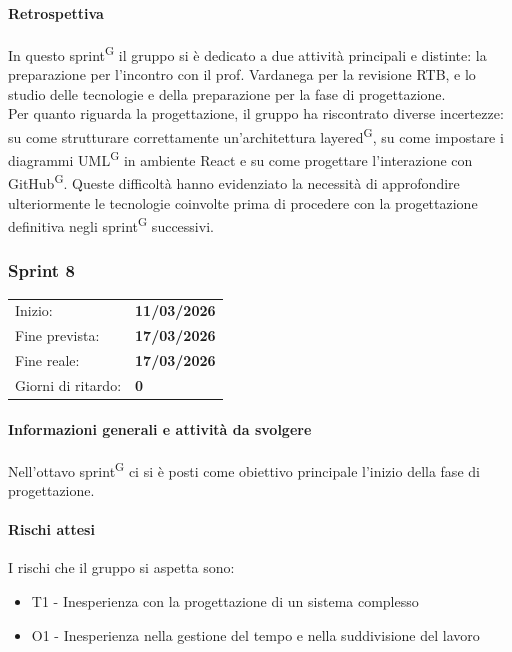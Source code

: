 \documentclass[a4paper, 11pt]{article}
\newcommand{\subsubsubsection}[1]{\paragraph{#1}}
\begin{document}
\subsubsubsection{Retrospettiva}
In questo sprint\textsuperscript{G} il gruppo si è dedicato a due attività principali e distinte: la preparazione per l'incontro con il prof. Vardanega per la revisione RTB, e lo studio delle tecnologie e della preparazione per la fase di progettazione.\\
Per quanto riguarda la progettazione, il gruppo ha riscontrato diverse incertezze: su come strutturare correttamente un'architettura layered\textsuperscript{G}, su come impostare i diagrammi UML\textsuperscript{G} in ambiente React e su come progettare l'interazione con GitHub\textsuperscript{G}. Queste difficoltà hanno evidenziato la necessità di approfondire ulteriormente le tecnologie coinvolte prima di procedere con la progettazione definitiva negli sprint\textsuperscript{G} successivi.


\newpage

\subsubsection{Sprint 8}
\begin{tabular}{ll}
	Inizio: & \textbf{11/03/2026} \\
	Fine prevista: & \textbf{17/03/2026} \\
	Fine reale: & \textbf{17/03/2026} \\
	Giorni di ritardo: & \textbf{0} \\
\end{tabular}

\subsubsubsection{Informazioni generali e attività da svolgere}
Nell'ottavo sprint\textsuperscript{G} ci si è posti come obiettivo principale l'inizio della fase di progettazione.\\

\subsubsubsection{Rischi attesi}
I rischi che il gruppo si aspetta sono:
\begin{itemize}
	\item T1 - Inesperienza con la progettazione di un sistema complesso
	\item O1 - Inesperienza nella gestione del tempo e nella suddivisione del lavoro
\end{itemize}
\end{document}
